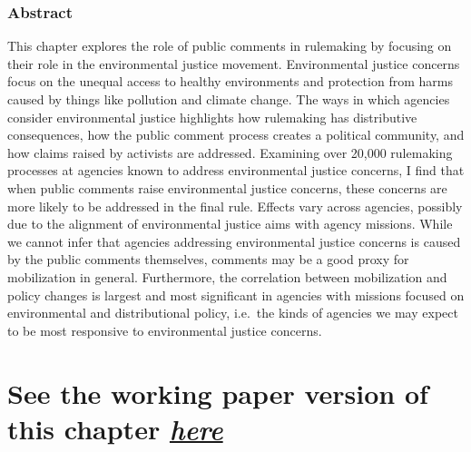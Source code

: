 \documentclass[
]{book}
\begin{document}
\hypertarget{abstract-4}{%
\subsubsection*{Abstract}\label{abstract-4}}

This chapter explores the role of public comments in rulemaking by focusing on their role in the environmental justice movement. Environmental justice concerns focus on the unequal access to healthy environments and protection from harms caused by things like pollution and climate change. The ways in which agencies consider environmental justice highlights how rulemaking has distributive consequences, how the public comment process creates a political community, and how claims raised by activists are addressed. Examining over 20,000 rulemaking processes at agencies known to address environmental justice concerns, I find that when public comments raise environmental justice concerns, these concerns are more likely to be addressed in the final rule. Effects vary across agencies, possibly due to the alignment of environmental justice aims with agency missions. While we cannot infer that agencies addressing environmental justice concerns is caused by the public comments themselves, comments may be a good proxy for mobilization in general. Furthermore, the correlation between mobilization and policy changes is largest and most significant in agencies with missions focused on environmental and distributional policy, i.e.~the kinds of agencies we may expect to be most responsive to environmental justice concerns.

\hypertarget{see-the-working-paper-version-of-this-chapter-here-2}{%
\section{\texorpdfstring{See the working paper version of this chapter \href{https://judgelord.github.io/research/ej/}{\emph{here}}}{See the working paper version of this chapter here}}\label{see-the-working-paper-version-of-this-chapter-here-2}}

  
\end{document}
